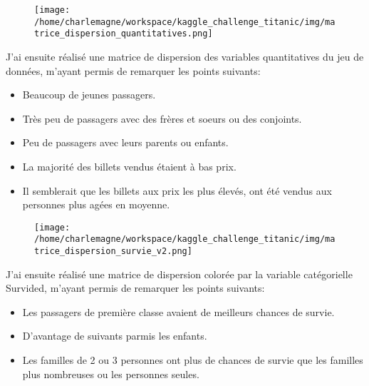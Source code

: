 \documentclass[9pt]{article}
\begin{document}
\begin{figure}[htbp]
    \centering
    \begin{adjustbox}{width=0.80\linewidth}
    \texttt{[image: /home/charlemagne/workspace/kaggle\_challenge\_titanic/img/matrice\_dispersion\_quantitatives.png]}
    \end{adjustbox}
\end{figure}
\noindent J'ai ensuite réalisé une matrice de dispersion des variables quantitatives du jeu de données, m'ayant permis de remarquer
les points suivants:
\begin{itemize}
    \item Beaucoup de jeunes passagers.
    \item Très peu de passagers avec des frères et soeurs ou des conjoints.
    \item Peu de passagers avec leurs parents ou enfants.
    \item La majorité des billets vendus étaient à bas prix.
    \item Il semblerait que les billets aux prix les plus élevés, ont été vendus aux personnes
    plus agées en moyenne.
\end{itemize}

\clearpage
\begin{figure}[htbp]
    \centering
    \begin{adjustbox}{width=1\linewidth}
    \texttt{[image: /home/charlemagne/workspace/kaggle\_challenge\_titanic/img/matrice\_dispersion\_survie\_v2.png]}
    \end{adjustbox}
\end{figure}
\noindent J'ai ensuite réalisé une matrice de dispersion colorée par la variable catégorielle Survided, m'ayant permis de remarquer
les points suivants:
\begin{itemize}
    \item Les passagers de première classe avaient de meilleurs chances de survie.
    \item D'avantage de suivants parmis les enfants.
    \item Les familles de 2 ou 3 personnes ont plus de chances de survie que les familles plus 
    nombreuses ou les personnes seules.
\end{itemize}

\vspace*{12pt}
\end{document}
